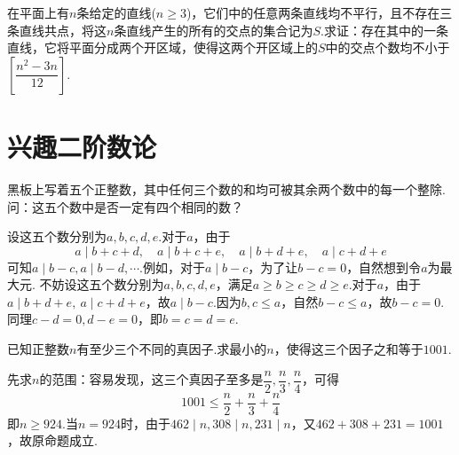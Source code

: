 \documentclass[cn,hazy,black,10pt,normal]{elegantnote}
\newenvironment{guess}{
  \color{guess}}{\newline \color{black}}
\begin{document}
\begin{problem} %
	在平面上有$n$条给定的直线($n \geq 3$)，它们中的任意两条直线均不平行，且不存在三条直线共点，将这$n$条直线产生的所有的交点的集合记为$S$.求证：存在其中的一条直线，它将平面分成两个开区域，使得这两个开区域上的$S$中的交点个数均不小于$\left[ \dfrac{n^2-3n}{12} \right]$.
\end{problem}
\begin{solution}
	
\end{solution}


\chapter{兴趣二阶数论}

\begin{cproblem} %
	黑板上写着五个正整数，其中任何三个数的和均可被其余两个数中的每一个整除.问：这五个数中是否一定有四个相同的数？
\end{cproblem}
\begin{solution}
	\begin{guess}
		设这五个数分别为$a,b,c,d,e$.对于$a$，由于$$a\mid b+c+d,\quad a\mid b+c+e,\quad a\mid b+d+e,\quad a\mid c+d+e$$
		可知$a\mid b-c,a\mid b-d,\cdots$.例如，对于$a\mid b-c$，为了让$b-c=0$，自然想到令$a$为最大元.
	\end{guess}
	不妨设这五个数分别为$a,b,c,d,e$，满足$a \geq b \geq c \geq d \geq e$.对于$a$，由于$a\mid b+d+e,~a\mid c+d+e$，故$a\mid b-c$.因为$b,c \leq a$，自然$b-c \leq a$，故$b-c=0$.同理$c-d=0,d-e=0$，即$b=c=d=e$.
\end{solution}

\begin{cproblem} %
	已知正整数$n$有至少三个不同的真因子.求最小的$n$，使得这三个因子之和等于$1001$.
\end{cproblem}
\begin{solution}
	先求$n$的范围：容易发现，这三个真因子至多是$\dfrac{n}{2},\dfrac{n}{3},\dfrac{n}{4}$，可得$$1001 \leq \frac{n}{2} + \frac{n}{3} + \frac{n}{4}$$
	即$n \geq 924$.当$n=924$时，由于$462\mid n,308\mid n,231\mid n$，又$462+308+231=1001$，故原命题成立.
\end{solution}
\end{document}
